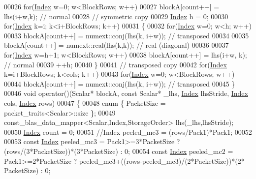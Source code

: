 \begin{DoxyCode}
00026       \textcolor{keywordflow}{for}(\hyperlink{namespace_eigen_a62e77e0933482dafde8fe197d9a2cfde}{Index} w=0; w<BlockRows; w++)
00027         blockA[count++] = lhs(i+w,k);           \textcolor{comment}{// normal}
00028     \textcolor{comment}{// symmetric copy}
00029     \hyperlink{namespace_eigen_a62e77e0933482dafde8fe197d9a2cfde}{Index} h = 0;
00030     \textcolor{keywordflow}{for}(\hyperlink{namespace_eigen_a62e77e0933482dafde8fe197d9a2cfde}{Index} k=i; k<i+BlockRows; k++)
00031     \{
00032       \textcolor{keywordflow}{for}(\hyperlink{namespace_eigen_a62e77e0933482dafde8fe197d9a2cfde}{Index} w=0; w<h; w++)
00033         blockA[count++] = numext::conj(lhs(k, i+w)); \textcolor{comment}{// transposed}
00034 
00035       blockA[count++] = numext::real(lhs(k,k));   \textcolor{comment}{// real (diagonal)}
00036 
00037       \textcolor{keywordflow}{for}(\hyperlink{namespace_eigen_a62e77e0933482dafde8fe197d9a2cfde}{Index} w=h+1; w<BlockRows; w++)
00038         blockA[count++] = lhs(i+w, k);          \textcolor{comment}{// normal}
00039       ++h;
00040     \}
00041     \textcolor{comment}{// transposed copy}
00042     \textcolor{keywordflow}{for}(\hyperlink{namespace_eigen_a62e77e0933482dafde8fe197d9a2cfde}{Index} k=i+BlockRows; k<cols; k++)
00043       \textcolor{keywordflow}{for}(\hyperlink{namespace_eigen_a62e77e0933482dafde8fe197d9a2cfde}{Index} w=0; w<BlockRows; w++)
00044         blockA[count++] = numext::conj(lhs(k, i+w)); \textcolor{comment}{// transposed}
00045   \}
00046   \textcolor{keywordtype}{void} operator()(Scalar* blockA, \textcolor{keyword}{const} Scalar* \_lhs, \hyperlink{namespace_eigen_a62e77e0933482dafde8fe197d9a2cfde}{Index} lhsStride, 
      \hyperlink{namespace_eigen_a62e77e0933482dafde8fe197d9a2cfde}{Index} cols, \hyperlink{namespace_eigen_a62e77e0933482dafde8fe197d9a2cfde}{Index} rows)
00047   \{
00048     \textcolor{keyword}{enum} \{ PacketSize = packet\_traits<Scalar>::size \};
00049     const\_blas\_data\_mapper<Scalar,Index,StorageOrder> lhs(\_lhs,lhsStride);
00050     \hyperlink{namespace_eigen_a62e77e0933482dafde8fe197d9a2cfde}{Index} count = 0;
00051     \textcolor{comment}{//Index peeled\_mc3 = (rows/Pack1)*Pack1;}
00052     
00053     \textcolor{keyword}{const} \hyperlink{namespace_eigen_a62e77e0933482dafde8fe197d9a2cfde}{Index} peeled\_mc3 = Pack1>=3*PacketSize ? (rows/(3*PacketSize))*(3*PacketSize) : 0;
00054     \textcolor{keyword}{const} \hyperlink{namespace_eigen_a62e77e0933482dafde8fe197d9a2cfde}{Index} peeled\_mc2 = Pack1>=2*PacketSize ? peeled\_mc3+((rows-peeled\_mc3)/(2*PacketSize))*(2*
      PacketSize) : 0;

\end{DoxyCode}
